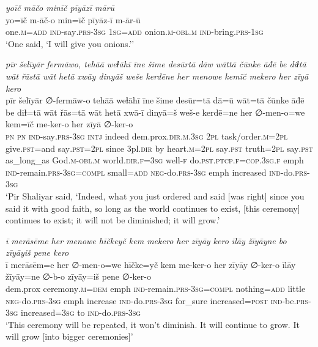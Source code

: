 \ea \label{ŽP.240}
\textit{yoīč māčo minīč pīyāzī mārū} \\ 
\gll yo=īč m-āč-o min=īč pīyāz-ī m-ār-ū \\ 
 one\textsc{.m}\textsc{=add} \textsc{ind-}say\textsc{.prs}\textsc{-3sg} \textsc{1sg}\textsc{=add} onion\textsc{.m}\textsc{-obl}\textsc{.m} \textsc{ind-}bring\textsc{.prs}\textsc{-\textsc{1sg}} \\ 
\glt `One said, ‘I will give you onions.’'
\z 
 
\ea \label{ŽP.243}
\textit{pīr šelīyār fermāwo, tehāā weɫāhī īne šime desūrtā dāw wāttā čūnke āđē be diɫtā wāt řāstā wāt hetā xwāy dinyāš weše kerdēne her menowe kemīč mekero her zīyā kero} \\ 
\gll pīr šelīyār ∅-fermāw-o tehāā weɫāhī īne šime desūr=tā dā=ū wāt=tā čūnke āđē be diɫ=tā wāt řās=tā wāt hetā xwā-ī dinyā=š weš-e kerdē=ne her ∅-men-o=we kem=īč me-ker-o her zīyā ∅-ker-o \\ 
 \textsc{pn} \textsc{pn} \textsc{ind-}say\textsc{.prs}\textsc{-3sg} \textsc{intj} indeed dem.prox\textsc{.dir}\textsc{.m}\textsc{.3sg} \textsc{2pl} task/order\textsc{.m}=\textsc{2pl} give\textsc{.pst}=and say\textsc{.pst}=\textsc{2pl} since 3pl\textsc{.dir} by heart\textsc{.m}=\textsc{2pl} say\textsc{.pst} truth=\textsc{2pl} say\textsc{.pst} as\_long\_as God\textsc{.m}\textsc{-obl}\textsc{.m} world\textsc{.dir}\textsc{.f}\textsc{=3sg} well\textsc{-f} do\textsc{.pst}\textsc{.ptcp}\textsc{.f}\textsc{=cop}\textsc{.3sg}\textsc{.f} emph \textsc{ind-}remain\textsc{.prs}\textsc{-3sg}\textsc{=compl} small\textsc{=add} \textsc{neg-}do\textsc{.prs}\textsc{-3sg} emph increased \textsc{ind-}do\textsc{.prs}\textsc{-3sg} \\ 
\glt `Pir Shaliyar said, ‘Indeed, what you just ordered and said [was right] since you said it with good faith, so long as the world continues to exist, [this ceremony] continues to exist; it will not be diminished; it will grow.'
\z 
 
\ea \label{ŽP.245}
\textit{ī merāsēme her menowe hīčkeyč kem mekero her zīyāy kero īlāy žīyāyne bo zīyāyiš pene kero} \\ 
\gll ī merāsēm=e her ∅-men-o=we hīčke=yč kem me-ker-o her zīyāy ∅-ker-o īlāy žīyāy=ne ∅-b-o zīyāy=iš pene ∅-ker-o \\ 
 dem.prox ceremony\textsc{.m}\textsc{=dem} emph \textsc{ind-}remain\textsc{.prs}\textsc{-3sg}\textsc{=compl} nothing\textsc{=add} little \textsc{neg-}do\textsc{.prs}\textsc{-3sg} emph increase \textsc{ind-}do\textsc{.prs}\textsc{-3sg} for\_sure increased\textsc{=\textsc{post}} \textsc{ind-}be\textsc{.prs}\textsc{-3sg} increased\textsc{=3sg} to \textsc{ind-}do\textsc{.prs}\textsc{-3sg} \\ 
\glt `This ceremony will be repeated, it won’t diminish. It will continue to grow. It will grow [into bigger ceremonies]'
\z 
 
